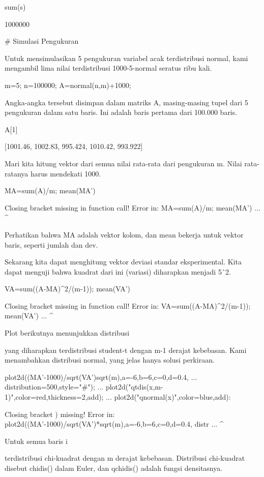 \documentclass{article}
\begin{document}
\>sum(s)


    1000000

# Simulasi Pengukuran

Untuk mensimulasikan 5 pengukuran variabel acak terdistribusi normal,
kami mengambil lima nilai terdistribusi 1000-5-normal seratus ribu
kali.


\>m=5; n=100000; A=normal(n,m)+1000;


Angka-angka tersebut disimpan dalam matriks A, masing-masing tupel
dari 5 pengukuran dalam satu baris. Ini adalah baris pertama dari
100.000 baris.


\>A[1]


    [1001.46,  1002.83,  995.424,  1010.42,  993.922]

Mari kita hitung vektor dari semua nilai rata-rata dari pengukuran m.
Nilai rata-ratanya harus mendekati 1000.


\>MA=sum(A)/m; mean(MA’)


    Closing bracket missing in function call!
    Error in:
    MA=sum(A)/m; mean(MA’) ...
                        ^

Perhatikan bahwa MA adalah vektor kolom, dan mean bekerja untuk vektor
baris, seperti jumlah dan dev.


Sekarang kita dapat menghitung vektor deviasi standar eksperimental.
Kita dapat menguji bahwa kuadrat dari ini (variasi) diharapkan menjadi
5ˆ2.


\>VA=sum((A-MA)^2/(m-1)); mean(VA’)


    Closing bracket missing in function call!
    Error in:
    VA=sum((A-MA)^2/(m-1)); mean(VA’) ...
                                   ^

Plot berikutnya menunjukkan distribusi


yang diharapkan terdistribusi student-t dengan m-1 derajat kebebasan.
Kami menambahkan distribusi normal, yang jelas hanya solusi perkiraan.


\>plot2d((MA’-1000)/sqrt(VA’)\*sqrt(m),a=-6,b=6,c=0,d=0.4, ...  
\>    distribution=500,style="#"); ...  
\>    plot2d("qtdis(x,m-1)",color=red,thickness=2,\>add); ...  
\>    plot2d("qnormal(x)",color=blue,\>add):


    Closing bracket ) missing!
    Error in:
    plot2d((MA’-1000)/sqrt(VA’)*sqrt(m),a=-6,b=6,c=0,d=0.4,  distr ...
              ^

Untuk semua baris i


terdistribusi chi-kuadrat dengan m derajat kebebasan. Distribusi
chi-kuadrat disebut chidis() dalam Euler, dan qchidis() adalah fungsi
densitasnya.
\end{document}
